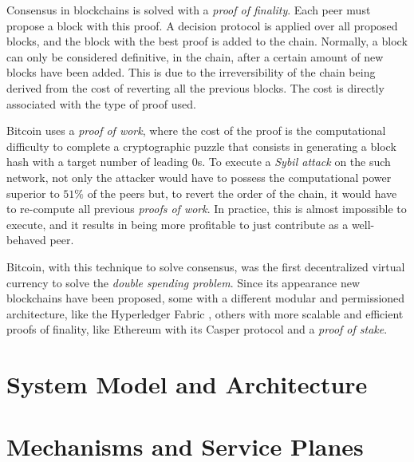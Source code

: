 \documentclass[10pt,journal,compsoc]{IEEEtran}
\begin{document}
	Consensus in blockchains is solved with a \textit{proof of finality}. Each peer must propose a block with this proof. A decision protocol is applied over all proposed blocks, and the block with the best proof is added to the chain. Normally, a block can only be considered definitive, in the chain, after a certain amount of new blocks have been added. This is due to the irreversibility of the chain being derived from the cost of reverting all the previous blocks. The cost is directly associated with the type of proof used.

	Bitcoin\cite{nakamoto2019bitcoin} uses a \textit{proof of work}, where the cost of the proof is the computational difficulty to complete a cryptographic puzzle that consists in generating a block hash with a target number of leading 0s. To execute a \textit{Sybil attack} on the such network, not only the attacker would have to possess the computational power superior to $51\%$ of the peers but, to revert the order of the chain, it would have to re-compute all previous \textit{proofs of work}. In practice, this is almost impossible to execute, and it results in being more profitable to just contribute as a well-behaved peer.

	Bitcoin, with this technique to solve consensus, was the first decentralized virtual currency to solve the \textit{double spending problem}. Since its appearance new blockchains have been proposed, some with a different modular and permissioned architecture, like the Hyperledger Fabric \cite{androulaki2018hyperledger}\cite{sousa2018byzantineHyperledger}, others with more scalable and efficient proofs of finality\cite{croman2016scaling}, like Ethereum with its Casper protocol\cite{CasperTheFriendlyFinalityGadget}\cite{CasperMadeSimple} and a \textit{proof of stake}.

	
	
	\section{System Model and Architecture}


	\section{Mechanisms and Service Planes}
\end{document}
